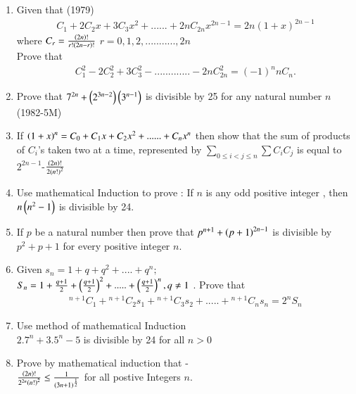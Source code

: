 \documentclass[journal,12pt,twocolumn]{IEEEtran}
\theoremstyle{remark}
\begin{document}
    
     \begin{enumerate}
		
             \item Given that  \hfill{(1979)}
		     \begin{align*}
		C_1+2C_2x+3C_3x^2+......+2nC_{2n}x^{2n-1}=2n(1+x)^{2n-1}
		     \end{align*}
		where $ C_r =\frac{\left(2n\right)!}{r!\left(2n-r\right)!}$ $r=0,1,2,...........,2n$\\
		          Prove that  \begin{align*} 
		     C^2_1-2C_2^2+3C_3^2-.............-2nC_{2n}^2  = (-1)^nnC_n. 
		     \end{align*}  

	      \item Prove that $ 7^{2n} + \left(2^{3n-2}\right)  \left(3^{n-1}\right) $ is divisible by 25 for any natural number $ n$ \hfill{(1982-5M)}  


             \item If $ \left(1+x\right)^n= C_0 + C_1x +C_2x^2+......+C_nx^n $ then show that the sum of products of $ C_i $'s taken
	   two at a time, represented by $ \displaystyle\sum_{0 \leq i<j \leq n} \displaystyle\sum C_i C_j $ is equal to $ 2^{2n-1}$-$\frac{\left(2n\right)!} {2\left(n!\right)^2} $ \hfill{}

	     \item Use mathematical Induction to prove : If $n$ is any odd positive integer , then  $ n\left(n^2-1\right) $ is divisible by 24. \hfill{}


	    \item If $ p $ be a natural number then prove that $ p^{n+1}+\left(p+1\right)^{2n-1} $ is divisible by $ p^2+p+1 $ for every positive integer $n$. \hfill{} 

            \item Given  $ s_n = 1 + q + q^2 +....+q^n;$\\
		    $ S_n = 1 + \frac{q+1}{2}+\left(\frac{q+1}{2}\right)^2+.....+\left(\frac{q+1}{2}\right)^n,q\neq1 $ . Prove that	\begin{align*} 
		    {}^{n+1}C_1+{}^{n+1}C_2s_1+{}^{n+1}C_3s_2+.....+{}^{n+1}C_ns_n=2^nS_n
		    \end{align*}    \hfill{}


	    \item Use method of mathematical Induction \\ $ 2.7^n +3.5^n-5 $ is divisible by 24 for all $ n>0 $ \hfill{}


	    \item Prove by mathematical induction that -\\
		    $ \frac{\left(2n\right)!}{2^{2n}\left(n!\right)^2}\leq \frac{1}{\left(3n+1\right)^{\frac{1}{2}}} $  for all postive Integers $n$.\hfill {}



\end{enumerate}
\end{document}
